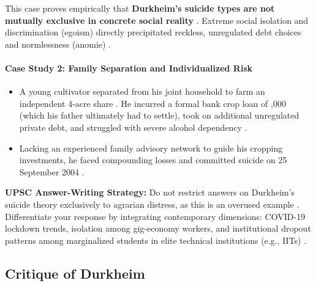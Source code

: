\begin{CriticalPoint}
This case proves empirically that \textbf{Durkheim's suicide types are not mutually exclusive in concrete social reality} . Extreme social isolation and discrimination (egoism) directly precipitated reckless, unregulated debt choices and normlessness (anomie) .
\end{CriticalPoint}

\paragraph{Case Study 2: Family Separation and Individualized Risk}
\begin{itemize}
    \item A young cultivator separated from his joint household to farm an independent 4-acre share . He incurred a formal bank crop loan of ,000 (which his father ultimately had to settle), took on additional unregulated private debt, and struggled with severe alcohol dependency .
    \item Lacking an experienced family advisory network to guide his cropping investments, he faced compounding losses and committed suicide on 25 September 2004 .
\end{itemize}

\begin{PYQLink}
\textbf{UPSC Answer-Writing Strategy:}
Do not restrict answers on Durkheim's suicide theory exclusively to agrarian distress, as this is an overused example . Differentiate your response by integrating contemporary dimensions: COVID-19 lockdown trends, isolation among gig-economy workers, and institutional dropout patterns among marginalized students in elite technical institutions (e.g., IITs) .
\end{PYQLink}

\subsection{Critique of Durkheim}

